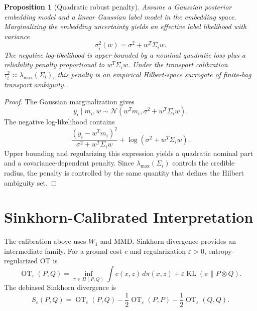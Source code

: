 \documentclass[10pt,journal]{IEEEtran}
\newtheorem{proposition}{Proposition}
\DeclareMathOperator{\OT}{OT}
\DeclareMathOperator{\KL}{KL}
\newcommand{\eps}{\varepsilon}
\begin{document}
\begin{proposition}[Quadratic robust penalty]
\label{prop:quad-penalty}
Assume a Gaussian posterior embedding model and a linear Gaussian label model in the embedding space. Marginalizing the embedding uncertainty yields an effective label likelihood with variance
\begin{equation}
    \sigma_i^2(w)=\sigma^2+w^T\Sigma_i w.
\end{equation}
The negative log-likelihood is upper-bounded by a nominal quadratic loss plus a reliability penalty proportional to $w^T\Sigma_i w$. Under the transport calibration $\tau_i^2\asymp \lambda_{\max}(\Sigma_i)$, this penalty is an empirical Hilbert-space surrogate of finite-bag transport ambiguity.
\end{proposition}

\begin{proof}
The Gaussian marginalization gives
\begin{equation}
    y_i\mid m_i,w\sim \mathcal{N}(w^Tm_i,\sigma^2+w^T\Sigma_iw).
\end{equation}
The negative log-likelihood contains
\begin{equation}
    \frac{(y_i-w^Tm_i)^2}{\sigma^2+w^T\Sigma_iw}+\log(\sigma^2+w^T\Sigma_iw).
\end{equation}
Upper bounding and regularizing this expression yields a quadratic nominal part and a covariance-dependent penalty. Since $\lambda_{\max}(\Sigma_i)$ controls the credible radius, the penalty is controlled by the same quantity that defines the Hilbert ambiguity set.
\end{proof}

\section{Sinkhorn-Calibrated Interpretation}
\label{sec:sinkhorn}

The calibration above uses $W_1$ and MMD. Sinkhorn divergence provides an intermediate family. For a ground cost $c$ and regularization $\eps>0$, entropy-regularized OT is
\begin{equation}
    \OT_\eps(P,Q)=\inf_{\pi\in\Pi(P,Q)}\int c(x,z)\,d\pi(x,z)+\eps\KL(\pi\|P\otimes Q).
\end{equation}
The debiased Sinkhorn divergence is
\begin{equation}
    S_\eps(P,Q)=\OT_\eps(P,Q)-\frac{1}{2}\OT_\eps(P,P)-\frac{1}{2}\OT_\eps(Q,Q).
\end{equation}
\end{document}
